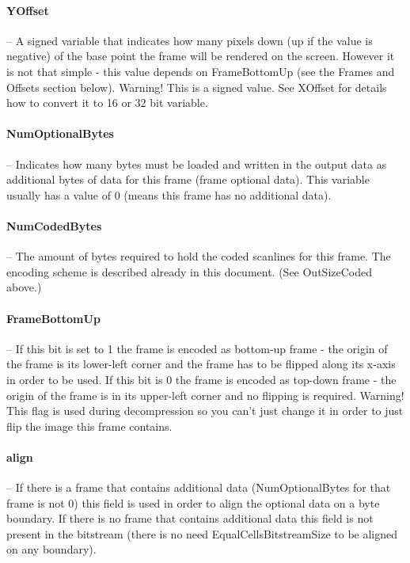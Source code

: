 \paragraph{YOffset} -- A signed variable that indicates how many pixels down 
(up if the value is negative) of the base point the frame will be rendered on 
the screen. However it is not that simple - this value depends on FrameBottomUp 
(see the Frames and Offsets section below). Warning! This is a signed value. 
See XOffset for details how to convert it to 16 or 32 bit variable.	

\paragraph{NumOptionalBytes} -- Indicates how many bytes must be loaded and 
written in the output data as additional bytes of data for this frame (frame 
optional data). This variable usually has a value of 0 (means this frame has no 
additional data).	

\paragraph{NumCodedBytes} -- The amount of bytes required to hold the coded 
scanlines for this frame. The encoding scheme is described already in this 
document. (See OutSizeCoded above.)	

\paragraph{FrameBottomUp} -- If this bit is set to 1 the frame is encoded as 
bottom-up frame - the origin of the frame is its lower-left corner and the frame 
has to be flipped along its x-axis in order to be used. If this bit is 0 the 
frame is encoded as top-down frame - the origin of the frame is in its 
upper-left corner and no flipping is required. Warning! This flag is used during 
decompression so you can't just change it in order to just flip the image this 
frame contains.	

\paragraph{align} -- If there is a frame that contains additional data 
(NumOptionalBytes for that frame is not 0) this field is used in order to align 
the optional data on a byte boundary. If there is no frame that contains 
additional data this field is not present in the bitstream (there is no need 
EqualCellsBitstreamSize to be aligned on any boundary).	

